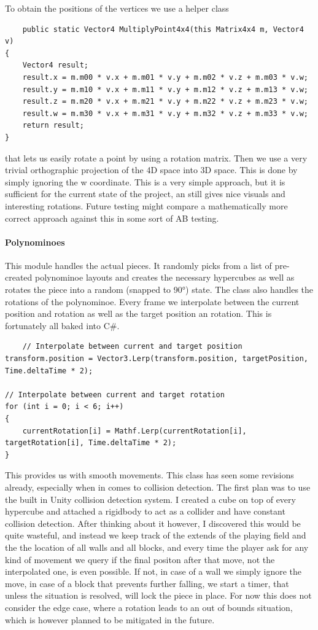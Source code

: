 \documentclass{article}
\begin{document}
To obtain the positions of the vertices we use a helper class 
\begin{verbatim}
    public static Vector4 MultiplyPoint4x4(this Matrix4x4 m, Vector4 v)
{
    Vector4 result;
    result.x = m.m00 * v.x + m.m01 * v.y + m.m02 * v.z + m.m03 * v.w;
    result.y = m.m10 * v.x + m.m11 * v.y + m.m12 * v.z + m.m13 * v.w;
    result.z = m.m20 * v.x + m.m21 * v.y + m.m22 * v.z + m.m23 * v.w;
    result.w = m.m30 * v.x + m.m31 * v.y + m.m32 * v.z + m.m33 * v.w;
    return result;
}
\end{verbatim}
that lets us easily rotate a point by using a rotation matrix. Then we use a very trivial orthographic projection of the 4D space into 3D space. This is done by simply ignoring the w coordinate. This is a very simple approach, but it is sufficient for the current state of the project, an still gives nice visuals and interesting rotations. Future testing might compare a mathematically more correct approach against this in some sort of AB testing.
\paragraph{Polynominoes}
This module  handles the actual pieces. It randomly picks from a list of pre-created polynominoe layouts and creates the necessary hypercubes as well as rotates the piece into a random (snapped to 90°) state. The class also handles the rotations of the polynominoe. Every frame we interpolate
between the current position and rotation as well as the target position an rotation. This is fortunately all baked into C\#.
\begin{verbatim}
    // Interpolate between current and target position
transform.position = Vector3.Lerp(transform.position, targetPosition, Time.deltaTime * 2);

// Interpolate between current and target rotation
for (int i = 0; i < 6; i++)
{
    currentRotation[i] = Mathf.Lerp(currentRotation[i], targetRotation[i], Time.deltaTime * 2);
}
\end{verbatim}
This provides us with smooth movements.
This class has seen some revisions already, especially when in comes to collision detection.
The first plan was to use the built in Unity collision detection system. I created a cube on top of every hypercube and attached a rigidbody to act as a collider and have constant collision detection. After thinking about it however, I discovered this would be quite wasteful, and instead we keep track of the extends of the playing field and the the location of all walls and all blocks, and every time the player ask for any kind of movement we query if the final positon after that move, not the interpolated one, is even possible. If not, in case of a wall we simply ignore the move, in case of a block that prevents further falling, we start a timer, that unless the situation is resolved, will lock the piece in place.
For now this does not consider the edge case, where a rotation leads to an out of bounds situation, which is however planned to be mitigated in the future.
\end{document}
